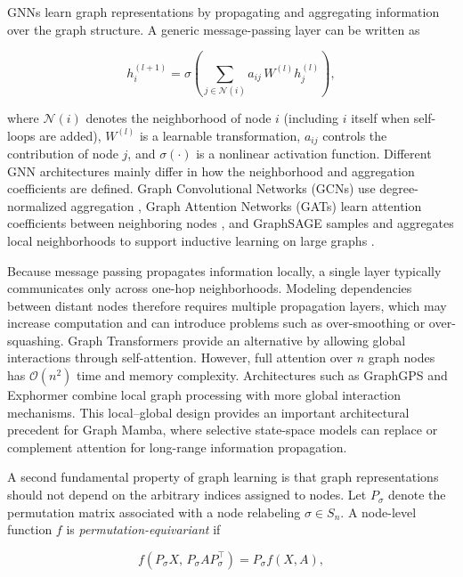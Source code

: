 \documentclass[acmsmall]{acmart}
\begin{document}
GNNs learn graph representations by propagating and
aggregating information over the graph structure. A generic message-passing
layer can be written as

\begin{equation}
h_i^{(l+1)}
=
\sigma\left(
\sum_{j\in\mathcal{N}(i)}
a_{ij}\,
W^{(l)}h_j^{(l)}
\right),
\label{eq:message-passing}
\end{equation}

where $\mathcal{N}(i)$ denotes the neighborhood of node $i$ (including $i$ itself when self-loops are added),
$W^{(l)}$ is a learnable transformation, $a_{ij}$ controls the contribution
of node $j$, and $\sigma(\cdot)$ is a nonlinear activation function.
Different GNN architectures mainly differ in how the neighborhood and
aggregation coefficients are defined. Graph Convolutional Networks (GCNs)
use degree-normalized aggregation \cite{kipf2016semi}, Graph Attention
Networks (GATs) learn attention coefficients between neighboring nodes
\cite{velivckovic2017graph}, and GraphSAGE samples and aggregates local
neighborhoods to support inductive learning on large graphs
\cite{hamilton2017inductive}.

Because message passing propagates information locally, a single layer
typically communicates only across one-hop neighborhoods. Modeling
dependencies between distant nodes therefore requires multiple propagation
layers, which may increase computation and can introduce problems such as
over-smoothing or over-squashing. Graph Transformers provide an alternative
by allowing global interactions through self-attention. However, full
attention over $n$ graph nodes has $\mathcal{O}(n^2)$ time and memory
complexity. Architectures such as GraphGPS
\cite{rampavsek2022recipe} and Exphormer
\cite{shirzad2023exphormer} combine local graph processing with more global
interaction mechanisms. This local--global design provides an important
architectural precedent for Graph Mamba, where selective state-space models
can replace or complement attention for long-range information propagation.

A second fundamental property of graph learning is that graph representations
should not depend on the arbitrary indices assigned to nodes. Let
$P_\sigma$ denote the permutation matrix associated with a node relabeling
$\sigma\in S_n$. A node-level function $f$ is
\emph{permutation-equivariant} if

\begin{equation}
f(P_\sigma X,\,
  P_\sigma A P_\sigma^{\top})
=
P_\sigma f(X,A),
\label{eq:equivariance}
\end{equation}
\end{document}
